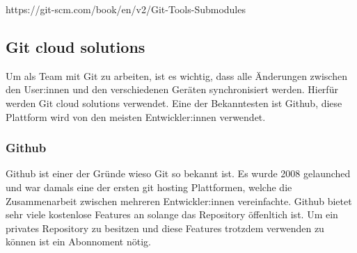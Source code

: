 https://git-scm.com/book/en/v2/Git-Tools-Submodules


\subsection{Git cloud solutions}

Um als Team mit Git zu arbeiten, ist es wichtig, dass alle Änderungen zwischen den User:innen und den verschiedenen Geräten synchronisiert werden. Hierfür werden Git cloud solutions verwendet. Eine der Bekanntesten ist Github, diese Plattform wird von den meisten Entwickler:innen verwendet.

\subsubsection{Github}

Github ist einer der Gründe wieso Git so bekannt ist. Es wurde 2008 gelaunched und war damals eine der ersten git hosting Plattformen, welche die Zusammenarbeit zwischen mehreren Entwickler:innen vereinfachte. Github bietet sehr viele kostenlose Features an solange das Repository öffenltich ist. Um ein privates Repository zu besitzen und diese Features trotzdem verwenden zu können ist ein Abonnoment nötig.

\cite{Github_1}
\cite{Github_2}